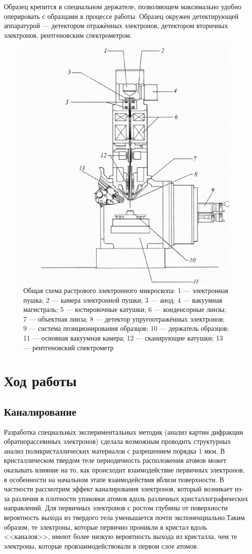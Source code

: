 \documentclass[a4paper,12pt]{article}
\begin{document}
Образец крепится в специальном держателе, позволяющем
максимально удобно оперировать с образцами в процессе работы.
Образец окружен детектирующей аппаратурой — детектором отражённых электронов, детектором вторичных электронов, рентгеновским спектрометром.

\begin{figure}[h]
    \centering
    \includegraphics[width = 0.5\linewidth]{fig3.png}
    \caption{Общая схема растрового электронного микроскопа:
1 — электронная пушка; 2 — камера электронной пушки;
3 — анод; 4 — вакуумная магистраль; 5 — юстировочные катушки;
6 — конденсорные линзы; 7 — объектная линза; 8 — детектор упругоотражённых
электронов; 9 — система позиционирования образцов; 10 — держатель образцов; 11 — основная вакуумная камера; 12 — сканирующие катушки; 13 — рентгеновский спектрометр}
    \label{setup}
\end{figure}
 
 \newpage
 
\section{Ход работы}

\subsection{Каналирование}

Разработка специальных экспериментальных методик (анализ картин дифракции обратнорассеянных электронов) сделала возможным проводить структурных анализ поликристаллических материалов с разрешением порядка 1 мкм. В кристаллическом твердом теле периодичность расположения атомов может оказывать влияние на то, как происходит взаимодействие первичных электронов, в особенности на начальном этапе взаимодействия вблизи поверхности. В частности рассмотрим эффект каналирования электронов, который возникает из-за различия в плотности упаковки атомов вдоль различных кристаллографических направлений. Для первичных электронов с ростом глубины от поверхности вероятность выхода из твердого тела уменьшается почти экспоненциально.Таким образом, те электроны, которые первично проникли в кристал вдоль <<каналов>>, имеют более низкую вероятность выхода из кристалла, чем те электроны, которые провзаимодействовали в первом слое атомов. 
\end{document}
